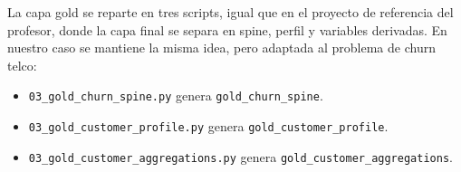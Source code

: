 \documentclass[12pt,a4paper]{article}
\begin{document}
La capa gold se reparte en tres scripts, igual que en el proyecto de referencia del profesor, donde la capa final se separa en spine, perfil y variables derivadas. En nuestro caso se mantiene la misma idea, pero adaptada al problema de churn telco:\par

\begin{itemize}
\item \nolinkurl{03_gold_churn_spine.py} genera \nolinkurl{gold_churn_spine}.
\item \nolinkurl{03_gold_customer_profile.py} genera \nolinkurl{gold_customer_profile}.
\item \nolinkurl{03_gold_customer_aggregations.py} genera \nolinkurl{gold_customer_aggregations}.
\end{itemize}
\end{document}
